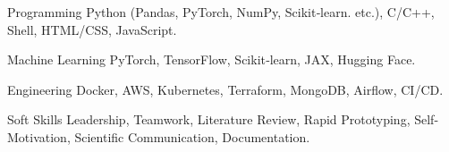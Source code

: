 

\begin{cvskills}

  \cvskill
    {Programming} %
    {Python (Pandas, PyTorch, NumPy, Scikit‑learn. etc.), C/C++, Shell, HTML/CSS, JavaScript.} %

  \cvskill
    {Machine Learning} %
    {PyTorch, TensorFlow, Scikit‑learn, JAX, Hugging Face.} %

  \cvskill
    {Engineering} %
    {Docker, AWS, Kubernetes, Terraform, MongoDB, Airflow, CI/CD.} %

  \cvskill
    {Soft Skills} %
    {Leadership, Teamwork, Literature Review, Rapid Prototyping, Self-Motivation, Scientific Communication, Documentation.} %

\end{cvskills}
